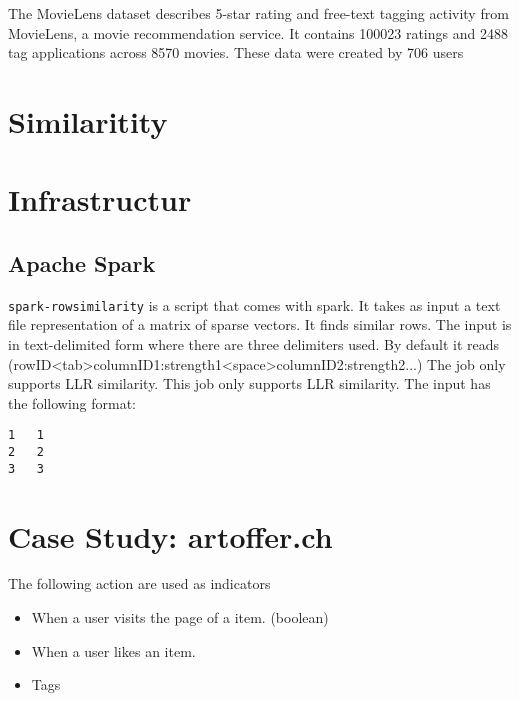 \documentclass[twoside,a4paper]{article}
\begin{document}
The MovieLens dataset describes 5-star rating and free-text tagging activity from MovieLens, a movie recommendation service. It contains 100023 ratings and 2488 tag applications across 8570 movies. These data were created by 706 users 


\section{Similaritity}
\label{sec:similarity}



\section{Infrastructur}
\label{sec:infrastructur}


\subsection{Apache Spark}
\label{sec:spark}
\verb|spark-rowsimilarity| is a script that comes with spark. It takes as input a text file representation of a matrix of sparse vectors. It finds similar rows. The input is in text-delimited form where there are three delimiters used. By default it reads (rowID<tab>columnID1:strength1<space>columnID2:strength2...) The job only supports LLR similarity. This job only supports LLR similarity.
The input has the following format:
\begin{verbatim}
1	1
2	2
3	3 
\end{verbatim}

\section{Case Study: artoffer.ch}
\label{sec:artoffer}

The following action are used as indicators
\begin{itemize}
\item When a user visits the page of a item. (boolean)
\item When a user likes an item.
\item Tags
\end{itemize}


\end{document}
